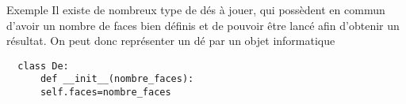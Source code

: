 \documentclass[10pt]{beamer}
\begin{document}
\begin{frame}[fragile]
	\mframe{\POO}
	\begin{exampleblock}{Exemple}
		Il existe de nombreux type de dés à jouer, qui possèdent en commun d'avoir un nombre de faces bien définis et de pouvoir être lancé afin d'obtenir un résultat. On peut donc représenter un dé par un objet informatique
		\begin{lstlisting}
  class De:
      def __init__(nombre_faces):
      self.faces=nombre_faces
\end{lstlisting}
	\end{exampleblock}
\end{frame}
\end{document}
